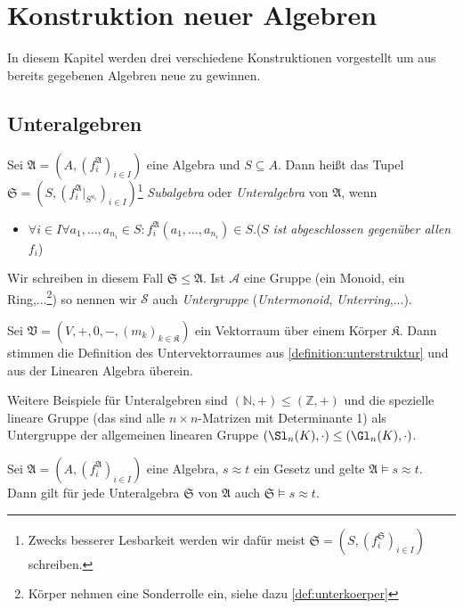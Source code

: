 \section{Konstruktion neuer Algebren}

In diesem Kapitel werden drei verschiedene Konstruktionen vorgestellt um aus bereits gegebenen Algebren neue zu gewinnen.

\subsection{Unteralgebren}

\begin{definition}\label{definition:unterstruktur}
    Sei $\mathfrak{A}=(A,(f^\mathfrak{A}_i)_{i\in I})$ eine Algebra und $S\subseteq A$. Dann heißt das Tupel $\mathfrak{S}=(S,(f^\mathfrak{A}_i|_{S^{n_i}})_{i\in I})$\footnote{Zwecks besserer Lesbarkeit werden wir dafür meist $\mathfrak{S}=(S,(f^\mathfrak{S}_i)_{i\in I})$ schreiben.}
    \emph{Subalgebra} oder \emph{Unteralgebra} von $\mathfrak{A}$, wenn
    \begin{itemize}
        \item $\forall i\in I\forall a_1,\ldots,a_{n_i}\in S:f^\mathfrak{A}_i(a_1,\ldots,a_{n_i})\in S.$\tab ($S$ \emph{ist abgeschlossen gegenüber allen} $f_i$)
    \end{itemize}
    Wir schreiben in diesem Fall $\mathfrak{S}\le \mathfrak{A}$. Ist $\mathcal{A}$ eine Gruppe (ein Monoid, ein Ring,...\footnote{Körper nehmen eine Sonderrolle ein, siehe dazu \cref{def:unterkoerper}}) so nennen wir $\mathcal{S}$ auch \emph{Untergruppe} (\emph{Untermonoid}, \emph{Unterring},...).
\end{definition}

\begin{example}
    Sei $\mathfrak{V}=(V,+,0,-,(m_k)_{k\in\mathfrak{K}})$ ein Vektorraum über einem Körper $\mathfrak{K}$. Dann stimmen die Definition des Untervektorraumes aus \cref{definition:unterstruktur} und aus der Linearen Algebra überein.
    
    Weitere Beispiele für Unteralgebren sind $(\mathbb{N},+)\le(\mathbb{Z},+)$ und die spezielle lineare Gruppe (das sind alle $n\times n$-Matrizen mit Determinante 1) als Untergruppe der allgemeinen linearen Gruppe $(\Sl_n(K),\cdot)\le (\Gl_n(K),\cdot)$.
\end{example}

\begin{proposition}\label{prop:unteralgebra}
    Sei $\mathfrak{A}=(A,(f^\mathfrak{A}_i)_{i\in I})$ eine Algebra, $s\approx t$ ein Gesetz und gelte $\mathfrak{A}\models s\approx t$.
    Dann gilt für jede Unteralgebra $\mathfrak{S}$ von $\mathfrak{A}$ auch $\mathfrak{S}\models s\approx t$.
\end{proposition}

